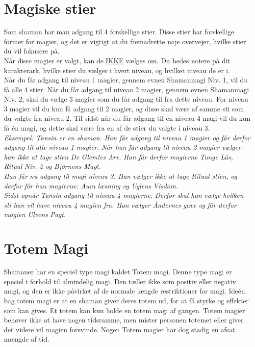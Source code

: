 \section{Magiske stier}
Som shaman har man adgang til 4 forskellige stier. Disse stier har forskellige former for magier, og det er vigtigt at du fremadrette nøje overvejer, hvilke stier du vil fokusere på.\\
Når disse magier er valgt, kan de \underline{IKKE} vælges om. Du bedes notere på dit karakterark, hvilke stier du vælger i hvert niveau, og hvilket niveau de er i.\\
Når du får adgang til niveau 1 magier, gennem evnen Shamanmagi Niv. 1, vil du få alle 4 stier. Når du får adgang til niveau 2 magier, gennem evnen Shamanmagi Niv. 2, skal du vælge 3 magier som du får adgang til fra dette niveau. For niveau 3 magier vil du kun få adgang til 2 magier, og disse skal være af samme sti som du valgte fra niveau 2. Til sidst når du får adgang til en niveau 4 magi vil du kun få én magi, og dette skal være fra en af de stier du valgte i niveau 3. \\
\textit{Eksempel: Tansin er en shaman. Han får adgang til niveau 1 magier og får derfor adgang til alle niveau 1 magier. Når han får adgang til niveau 2 magier vælger han ikke at tage stien De Glemtes Arv. Han får derfor magierne Tunge Lås, Ritual Niv. 2 og Bjørnens Magt.\\
Han får nu adgang til magi niveau 3. Han vælger ikke at tage Ritual stien, og derfor får han magierne: Aura læsning og Uglens Visdom.\\
Sidst opnår Tansin adgang til niveau 4 magierne. Derfor skal han vælge hvilken sti han vil have niveau 4 magien fra. Han vælger Åndernes gave og får derfor magien Ulvens Pagt.\\}

\section{Totem Magi}
Shamaner har en speciel type magi kaldet Totem magi. Denne type magi er speciel i forhold til almindelig magi. Den tæller ikke som positiv eller negativ magi, og den er ikke påvirket af de normale længde restriktioner for magi. Ideén bag totem magi er at en shaman giver deres totem ud, for at få styrke og effekter som kan gives. Et totem kan kun holde en totem magi af gangen. Totem magier behøver ikke at have nogen tidsramme, men mister personen totemet eller giver det videre vil magien forsvinde. Nogen Totem magier har dog stadig en afsat mængde af tid.

